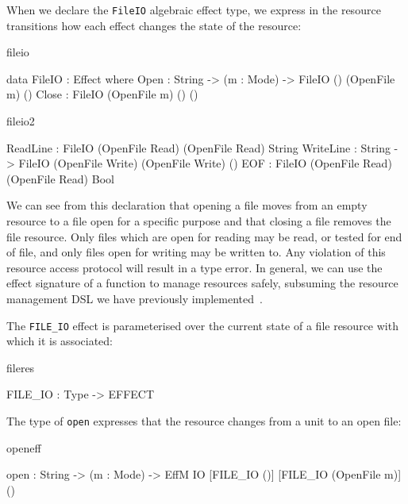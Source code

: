 \noindent
When we declare the \texttt{FileIO} algebraic effect type, we express in
the resource transitions how each effect changes the state of the resource:

\begin{SaveVerbatim}{fileio}

data FileIO : Effect where
     Open  : String -> (m : Mode) -> 
             FileIO () (OpenFile m) ()
     Close : FileIO (OpenFile m) () ()

\end{SaveVerbatim}

\begin{SaveVerbatim}{fileio2}

     ReadLine  : FileIO (OpenFile Read)  
                        (OpenFile Read) String
     WriteLine : String -> 
                 FileIO (OpenFile Write) 
                        (OpenFile Write) ()
     EOF       : FileIO (OpenFile Read)  
                        (OpenFile Read) Bool

\end{SaveVerbatim}

\noindent
We can see from this declaration that opening a file moves from an empty
resource to a file open for a specific purpose and that closing a file removes
the file resource. Only files which are open for reading may be read, or tested
for end of file, and only files open for writing may be written to. Any
violation of this resource access protocol will result in a type error.
In general, we can use the effect signature of a function to manage resources
safely, subsuming the resource management DSL we have previously
implemented~\cite{bradyresource}.

The \texttt{FILE\_IO} effect is parameterised over the current state of a
file resource with which it is associated:

\begin{SaveVerbatim}{fileres}

FILE_IO : Type -> EFFECT

\end{SaveVerbatim}

\noindent
The type of \texttt{open} expresses that the resource changes from a unit
to an open file:

\begin{SaveVerbatim}{openeff}

open : String -> (m : Mode) -> 
       EffM IO [FILE_IO ()] [FILE_IO (OpenFile m)] ()

\end{SaveVerbatim}

